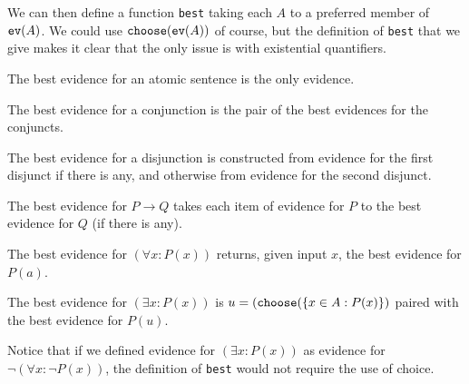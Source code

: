 \documentclass[12pt]{article}
\begin{document}
\begin{description}
\begin{description}
\end{description}

We can then define a function {\tt best} taking each $A$ to a preferred member of ${\tt ev}(A)$.  We could use ${\tt choose}({\tt ev}(A))$ of course, but the definition of {\tt best} that we give makes it clear that the only issue is with existential quantifiers.

The best evidence for an atomic sentence is the only evidence.

The best evidence for a conjunction is the pair of the best evidences for the conjuncts.

The best evidence for a disjunction is constructed from evidence for the first disjunct if there is any, and otherwise from evidence for the second disjunct.

The best evidence for $P\rightarrow Q$ takes each item of evidence for $P$ to the best evidence for $Q$ (if there is any).

The best evidence for $(\forall x:P(x))$ returns, given input $x$, the best evidence for $P(a)$.

The best evidence for $(\exists x:P(x))$ is $u=({\tt choose}(\{x \in A:P(x)\})$ paired with the best evidence for $P(u)$.

Notice that if we defined evidence for $(\exists x:P(x))$ as evidence for $\neg(\forall x:\neg P(x))$, the definition of {\tt best} would not require the use of choice.















\end{description}
\end{document}
